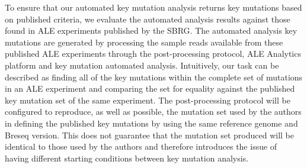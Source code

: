 \documentclass[12pt,final,masters,chapterheads]{ucsd}  %
\begin{document}
To ensure that our automated key mutation analysis returns key mutations based on published criteria, we evaluate the automated analysis results against those found in ALE experiments published by the SBRG. The automated analysis key mutations are generated by processing the sample reads available from these published ALE experiments through the post-processing protocol, ALE Analytics platform and key mutation automated analysis. Intuitively, our task can be described as finding all of the key mutations within the complete set of mutations in an ALE experiment and comparing the set for equality against the published key mutation set of the same experiment. The post-processing protocol will be configured to reproduce, as well as possible, the mutation set used by the authors in defining the published key mutations by using the same reference genome and Breseq version. This does not guarantee that the mutation set produced will be identical to those used by the authors and therefore introduces the issue of having different starting conditions between key mutation analysis.
\end{document}
